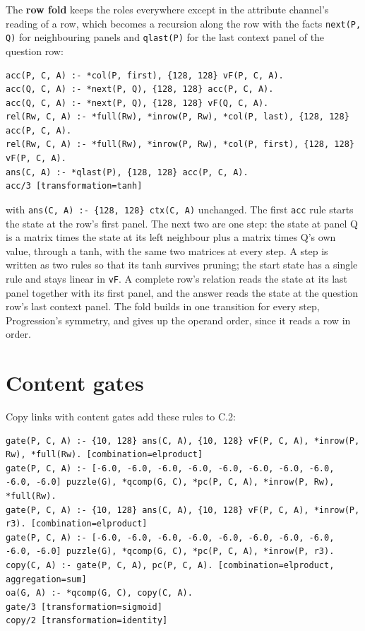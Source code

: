 The \textbf{row fold} keeps the roles everywhere except in the attribute channel's reading of a row, which becomes a recursion along the row with the facts \texttt{next(P, Q)} for neighbouring panels and \texttt{qlast(P)} for the last context panel of the question row:

\begin{Verbatim}[fontsize=\small,breaklines]
acc(P, C, A) :- *col(P, first), {128, 128} vF(P, C, A).
acc(Q, C, A) :- *next(P, Q), {128, 128} acc(P, C, A).
acc(Q, C, A) :- *next(P, Q), {128, 128} vF(Q, C, A).
rel(Rw, C, A) :- *full(Rw), *inrow(P, Rw), *col(P, last), {128, 128} acc(P, C, A).
rel(Rw, C, A) :- *full(Rw), *inrow(P, Rw), *col(P, first), {128, 128} vF(P, C, A).
ans(C, A) :- *qlast(P), {128, 128} acc(P, C, A).
acc/3 [transformation=tanh]
\end{Verbatim}

with \texttt{ans(C, A) :- \{128, 128\} ctx(C, A)} unchanged. The first \texttt{acc} rule starts the state at the row's first panel. The next two are one step: the state at panel Q is a matrix times the state at its left neighbour plus a matrix times Q's own value, through a tanh, with the same two matrices at every step. A step is written as two rules so that its tanh survives pruning; the start state has a single rule and stays linear in \texttt{vF}. A complete row's relation reads the state at its last panel together with its first panel, and the answer reads the state at the question row's last context panel. The fold builds in one transition for every step, Progression's symmetry, and gives up the operand order, since it reads a row in order.

\section{Content gates}\label{sec:C.5}

Copy links with content gates add these rules to C.2:

\begin{Verbatim}[fontsize=\small,breaklines]
gate(P, C, A) :- {10, 128} ans(C, A), {10, 128} vF(P, C, A), *inrow(P, Rw), *full(Rw). [combination=elproduct]
gate(P, C, A) :- [-6.0, -6.0, -6.0, -6.0, -6.0, -6.0, -6.0, -6.0, -6.0, -6.0] puzzle(G), *qcomp(G, C), *pc(P, C, A), *inrow(P, Rw), *full(Rw).
gate(P, C, A) :- {10, 128} ans(C, A), {10, 128} vF(P, C, A), *inrow(P, r3). [combination=elproduct]
gate(P, C, A) :- [-6.0, -6.0, -6.0, -6.0, -6.0, -6.0, -6.0, -6.0, -6.0, -6.0] puzzle(G), *qcomp(G, C), *pc(P, C, A), *inrow(P, r3).
copy(C, A) :- gate(P, C, A), pc(P, C, A). [combination=elproduct, aggregation=sum]
oa(G, A) :- *qcomp(G, C), copy(C, A).
gate/3 [transformation=sigmoid]
copy/2 [transformation=identity]
\end{Verbatim}

